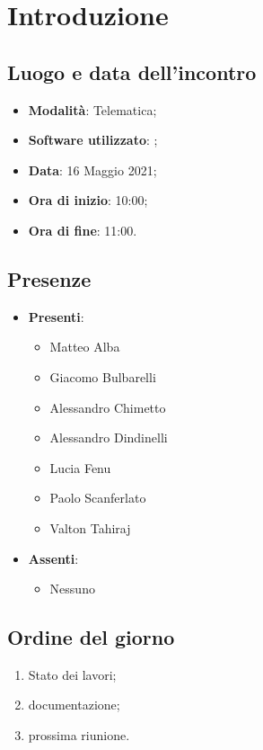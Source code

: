 \documentclass[]{article}
\begin{document}
	

	\newpage


		\section{Introduzione}
		\subsection{Luogo e data dell'incontro}
		\begin{itemize}
			\item \textbf{Modalità}: Telematica;
			\item \textbf{Software utilizzato}: ;
			\item \textbf{Data}: 16 Maggio 2021;
			\item \textbf{Ora di inizio}: 10:00;
			\item \textbf{Ora di fine}: 11:00.
		\end{itemize}

		\subsection{Presenze}
		\begin{itemize}
			\item \textbf{Presenti}:
			\begin{itemize}
				\item Matteo Alba
				\item Giacomo Bulbarelli
				\item Alessandro Chimetto
				\item Alessandro Dindinelli
				\item Lucia Fenu
				\item Paolo Scanferlato
				\item Valton Tahiraj
			\end{itemize}
			\item \textbf{Assenti}:
			\begin{itemize}
				\item Nessuno
			\end{itemize}
		\end{itemize}


		\subsection{Ordine del giorno}
		\begin{enumerate}
			\item Stato dei lavori;
			\item documentazione;
			\item prossima riunione.
		\end{enumerate}
\end{document}
